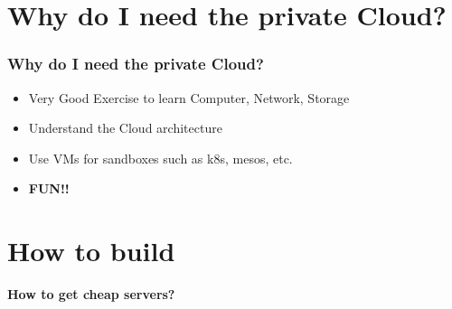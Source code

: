 \documentclass[aspectratio=169,11pt,hyperref={colorlinks=true}]{beamer}
\begin{document}
\section{Why do I need the private Cloud?}
\begin{frame}
  \frametitle{Why do I need the private Cloud?}
  \begin{itemize}
    \item Very Good Exercise to learn Computer, Network, Storage
    \item Understand the Cloud architecture
    \item Use VMs for sandboxes such as k8s, mesos, etc.
    \item \bf{FUN!!}
  \end{itemize}
\end{frame}

\section{How to build}
\begin{frame}
  \Huge{\bf{How to get cheap servers?}}
\end{frame}
\end{document}
